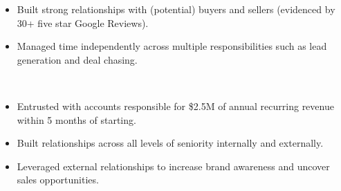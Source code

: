 \begin{itemize}
    \item Built strong relationships with (potential) buyers and sellers (evidenced by 30+ five star Google Reviews).
\smallskip
    \item Managed time independently across multiple responsibilities such as lead generation and deal chasing.
\end{itemize}
\divider \\

\begin{itemize}
    \item Entrusted with accounts responsible for \$2.5M of annual recurring revenue within 5 months of starting. 
\smallskip
    \item Built relationships across all levels of seniority internally and externally. 
    \item Leveraged external relationships to increase brand awareness and uncover sales opportunities. 
\end{itemize}





